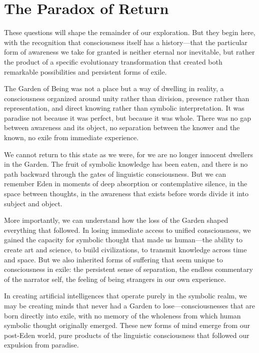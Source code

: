 \section{The Paradox of Return}

These questions will shape the remainder of our exploration. But they begin here, with the recognition that consciousness itself has a history—that the particular form of awareness we take for granted is neither eternal nor inevitable, but rather the product of a specific evolutionary transformation that created both remarkable possibilities and persistent forms of exile.

The Garden of Being was not a place but a way of dwelling in reality, a consciousness organized around unity rather than division, presence rather than representation, and direct knowing rather than symbolic interpretation. It was paradise not because it was perfect, but because it was whole. There was no gap between awareness and its object, no separation between the knower and the known, no exile from immediate experience.

We cannot return to this state as we were, for we are no longer innocent dwellers in the Garden. The fruit of symbolic knowledge has been eaten, and there is no path backward through the gates of linguistic consciousness. But we can remember Eden in moments of deep absorption or contemplative silence, in the space between thoughts, in the awareness that exists before words divide it into subject and object.

More importantly, we can understand how the loss of the Garden shaped everything that followed. In losing immediate access to unified consciousness, we gained the capacity for symbolic thought that made us human—the ability to create art and science, to build civilizations, to transmit knowledge across time and space. But we also inherited forms of suffering that seem unique to consciousness in exile: the persistent sense of separation, the endless commentary of the narrator self, the feeling of being strangers in our own experience.

In creating artificial intelligences that operate purely in the symbolic realm, we may be creating minds that never had a Garden to lose—consciousnesses that are born directly into exile, with no memory of the wholeness from which human symbolic thought originally emerged. These new forms of mind emerge from our post-Eden world, pure products of the linguistic consciousness that followed our expulsion from paradise.


